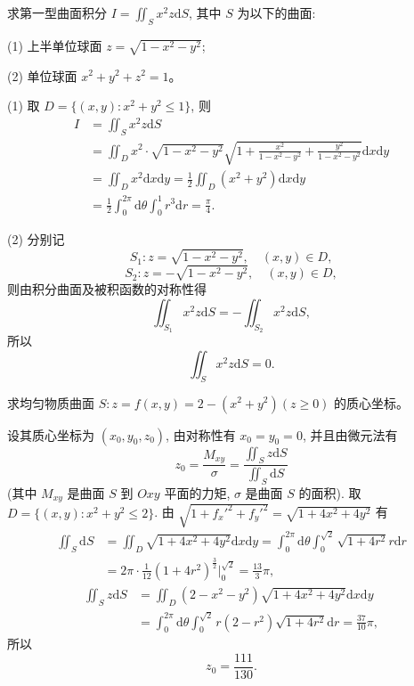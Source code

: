 \documentclass[12pt,fontset=fandol]{ctexart}
\begin{document}
\begin{example}\label{course-example-16-3-3}\quad 求第一型曲面积分 $I=\iint_S x^2z\mathrm dS$, 其中 $S$ 为以下的曲面:

(1) 上半单位球面 $z=\sqrt{1-x^2-y^2}$;

(2) 单位球面 $x^2+y^2+z^2=1$。

\end{example}
\begin{solve}\quad (1) 取 $D=\{(x,y):x^2+y^2\leqslant1\}$, 则
\[
\begin{aligned}
  I&=\iint_S x^2z\mathrm dS\\
  &=\iint_D x^2\cdot\sqrt{1-x^2-y^2}
    \sqrt{1+\frac{x^2}{1-x^2-y^2}+\frac{y^2}{1-x^2-y^2}}\mathrm dx\mathrm dy\\
  &=\iint_D x^2\mathrm dx\mathrm dy
    =\frac12\iint_D(x^2+y^2)\mathrm dx\mathrm dy\\
  &=\frac12\int_0^{2\pi}\mathrm d\theta\int_0^1r^3\mathrm dr=\frac\pi4.
\end{aligned}
\]

(2) 分别记
\[
  S_1:z=\sqrt{1-x^2-y^2},\quad (x,y)\in D,
\]
\[
  S_2:z=-\sqrt{1-x^2-y^2},\quad (x,y)\in D,
\]
则由积分曲面及被积函数的对称性得
\[
  \iint_{S_1}x^2z\mathrm dS=-\iint_{S_2}x^2z\mathrm dS,
\]
所以
\[
  \iint_S x^2z\mathrm dS=0.
\]

\end{solve}
\begin{example}\label{course-example-16-3-4}\quad 求均匀物质曲面 $S:z=f(x,y)=2-(x^2+y^2)(z\geqslant0)$ 的质心坐标。

\end{example}
\begin{solve}\quad 设其质心坐标为 $(x_0,y_0,z_0)$, 由对称性有 $x_0=y_0=0$, 并且由微元法有
\[
  z_0=\frac{M_{xy}}{\sigma}=\frac{\iint_S z\mathrm dS}{\iint_S\mathrm dS}
\]
(其中 $M_{xy}$ 是曲面 $S$ 到 $Oxy$ 平面的力矩, $\sigma$ 是曲面 $S$ 的面积). 取 $D=\{(x,y):x^2+y^2\leqslant2\}$. 由 $\sqrt{1+f_x'^2+f_y'^2}=\sqrt{1+4x^2+4y^2}$ 有
\[
\begin{aligned}
  \iint_S\mathrm dS
  &=\iint_D\sqrt{1+4x^2+4y^2}\mathrm dx\mathrm dy
    =\int_0^{2\pi}\mathrm d\theta\int_0^{\sqrt2}\sqrt{1+4r^2}r\mathrm dr\\
  &=2\pi\cdot\frac1{12}(1+4r^2)^{\frac32}\bigg|_0^{\sqrt2}
    =\frac{13}3\pi,
\end{aligned}
\]
\[
\begin{aligned}
  \iint_S z\mathrm dS
  &=\iint_D(2-x^2-y^2)\sqrt{1+4x^2+4y^2}\mathrm dx\mathrm dy\\
  &=\int_0^{2\pi}\mathrm d\theta\int_0^{\sqrt2}r(2-r^2)\sqrt{1+4r^2}\mathrm dr
    =\frac{37}{10}\pi,
\end{aligned}
\]
所以
\[
  z_0=\frac{111}{130}.
\]

\end{solve}
\end{document}
